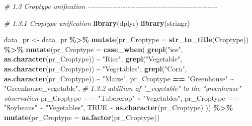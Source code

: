 \documentclass[
]{article}
\newenvironment{Shaded}{\begin{snugshade}}{\end{snugshade}}
\newcommand{\AttributeTok}[1]{\textcolor[rgb]{0.13,0.29,0.53}{#1}}
\newcommand{\CommentTok}[1]{\textcolor[rgb]{0.56,0.35,0.01}{\textit{#1}}}
\newcommand{\ConstantTok}[1]{\textcolor[rgb]{0.56,0.35,0.01}{#1}}
\newcommand{\FunctionTok}[1]{\textcolor[rgb]{0.13,0.29,0.53}{\textbf{#1}}}
\newcommand{\NormalTok}[1]{#1}
\newcommand{\OtherTok}[1]{\textcolor[rgb]{0.56,0.35,0.01}{#1}}
\newcommand{\SpecialCharTok}[1]{\textcolor[rgb]{0.81,0.36,0.00}{\textbf{#1}}}
\newcommand{\StringTok}[1]{\textcolor[rgb]{0.31,0.60,0.02}{#1}}
\begin{document}
\begin{Shaded}
\begin{Highlighting}[]
\CommentTok{\# 1.3 Croptype unification {-}{-}{-}{-}{-}{-}{-}{-}{-}{-}{-}{-}{-}{-}{-}{-}{-}{-}{-}{-}{-}{-}{-}{-}{-}{-}{-}{-}{-}{-}{-}{-}{-}{-}{-}{-}{-}{-}{-}{-}{-}{-}{-}{-}{-}{-}{-}{-}{-}{-}{-}{-}}

\CommentTok{\# 1.3.1 Croptype unification}
\FunctionTok{library}\NormalTok{(dplyr)}
\FunctionTok{library}\NormalTok{(stringr)}

\NormalTok{data\_pr }\OtherTok{\textless{}{-}} 
\NormalTok{  data\_pr }\SpecialCharTok{\%\textgreater{}\%}
  \FunctionTok{mutate}\NormalTok{(}\AttributeTok{pr\_Croptype =} \FunctionTok{str\_to\_title}\NormalTok{(Croptype)) }\SpecialCharTok{\%\textgreater{}\%}
  \FunctionTok{mutate}\NormalTok{(}\AttributeTok{pr\_Croptype =} \FunctionTok{case\_when}\NormalTok{(}
    \FunctionTok{grepl}\NormalTok{(}\StringTok{"ice"}\NormalTok{, }\FunctionTok{as.character}\NormalTok{(pr\_Croptype)) }\SpecialCharTok{\textasciitilde{}} \StringTok{"Rice"}\NormalTok{,}
    \FunctionTok{grepl}\NormalTok{(}\StringTok{"Vegetable"}\NormalTok{, }\FunctionTok{as.character}\NormalTok{(pr\_Croptype)) }\SpecialCharTok{\textasciitilde{}} \StringTok{"Vegetables"}\NormalTok{,}
    \FunctionTok{grepl}\NormalTok{(}\StringTok{"Corn"}\NormalTok{, }\FunctionTok{as.character}\NormalTok{(pr\_Croptype)) }\SpecialCharTok{\textasciitilde{}} \StringTok{"Maize"}\NormalTok{,}
\NormalTok{    pr\_Croptype }\SpecialCharTok{==} \StringTok{"Greenhouse"} \SpecialCharTok{\textasciitilde{}} \StringTok{"Greenhouse\_vegetable"}\NormalTok{, }\CommentTok{\# 1.3.2 addition of "\_vegetable" to the "greenhouse" observation}
\NormalTok{    pr\_Croptype }\SpecialCharTok{==} \StringTok{"Tubercrop"} \SpecialCharTok{\textasciitilde{}} \StringTok{"Vegetables"}\NormalTok{,}
\NormalTok{    pr\_Croptype }\SpecialCharTok{==} \StringTok{"Soybeans"} \SpecialCharTok{\textasciitilde{}} \StringTok{"Vegetables"}\NormalTok{,}
    \ConstantTok{TRUE} \SpecialCharTok{\textasciitilde{}} \FunctionTok{as.character}\NormalTok{(pr\_Croptype)}
\NormalTok{  )) }\SpecialCharTok{\%\textgreater{}\%}
  \FunctionTok{mutate}\NormalTok{(}\AttributeTok{pr\_Croptype =} \FunctionTok{as.factor}\NormalTok{(pr\_Croptype))}
\end{Highlighting}
\end{Shaded}
\end{document}
